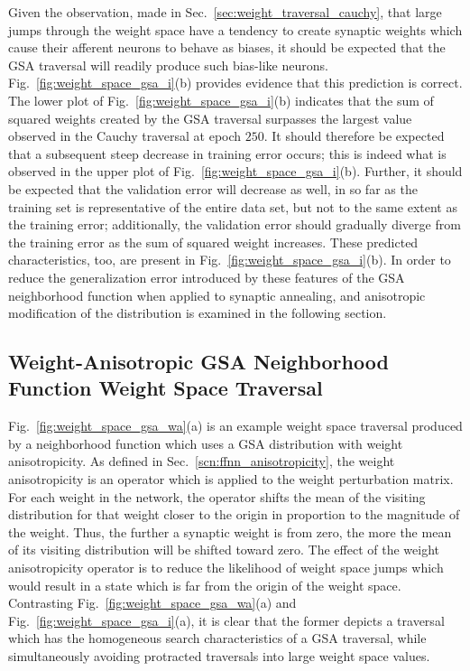\documentclass[11pt]{afthesis}
\begin{document}
	   	
   	Given the observation, made in Sec.~\ref{sec:weight_traversal_cauchy}, that large jumps through the weight space have a tendency to create synaptic weights which cause their afferent neurons to behave as biases, it should be expected that the GSA traversal will readily produce such bias-like neurons. Fig.~\ref{fig:weight_space_gsa_i}(b) provides evidence that this prediction is correct. The lower plot of Fig.~\ref{fig:weight_space_gsa_i}(b) indicates that the sum of squared weights created by the GSA traversal surpasses the largest value observed in the Cauchy traversal at epoch $250$. It should therefore be expected that a subsequent steep decrease in training error occurs; this is indeed what is observed in the upper plot of Fig.~\ref{fig:weight_space_gsa_i}(b). Further, it should be expected that the validation error will decrease as well, in so far as the training set is representative of the entire data set, but not to the same extent as the training error; additionally, the validation error should gradually diverge from the training error as the sum of squared weight increases. These predicted characteristics, too, are present in Fig.~\ref{fig:weight_space_gsa_i}(b). In order to reduce the generalization error introduced by these features of the GSA neighborhood function when applied to synaptic annealing, and anisotropic modification of the distribution is examined in the following section.
	   	
	\subsection{Weight-Anisotropic GSA Neighborhood Function Weight Space Traversal} 
	\label{scn:weight_space_gsa_wa}
		
	Fig.~\ref{fig:weight_space_gsa_wa}(a) is an example weight space traversal produced by a neighborhood function which uses a GSA distribution with weight anisotropicity. As defined in Sec.~\ref{scn:ffnn_anisotropicity}, the weight anisotropicity is an operator which is applied to the weight perturbation matrix. For each weight in the network, the operator shifts the mean of the visiting distribution for that weight closer to the origin in proportion to the magnitude of the weight. Thus, the further a synaptic weight is from zero, the more the mean of its visiting distribution will be shifted toward zero. The effect of the weight anisotropicity operator is to reduce the likelihood of weight space jumps which would result in a state which is far from the origin of the weight space. Contrasting Fig.~\ref{fig:weight_space_gsa_wa}(a) and Fig.~\ref{fig:weight_space_gsa_i}(a), it is clear that the former depicts a traversal which has the homogeneous search characteristics of a GSA traversal, while simultaneously avoiding protracted traversals into large weight space values.
	
\end{document}
